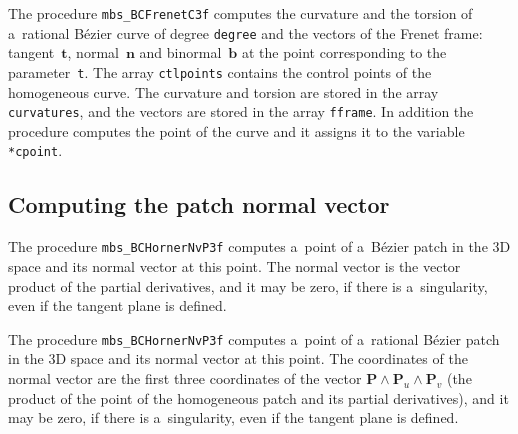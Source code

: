 \vspace{\bigskipamount}
The procedure \texttt{mbs\_BCFrenetC3f} computes the curvature and the torsion
of a~rational B\'{e}zier curve of degree \texttt{degree} and the vectors
of the Frenet frame: tangent~$\bm{t}$, normal~$\bm{n}$ and binormal~$\bm{b}$
at the point corresponding to the parameter~\texttt{t}. The array
\texttt{ctlpoints} contains the control points of the homogeneous curve.
The curvature and torsion are stored in the array \texttt{curvatures}, and
the vectors are stored in the array \texttt{fframe}. In addition the procedure
computes the point of the curve and it assigns it to the variable
\texttt{*cpoint}.


\subsection{Computing the patch normal vector}

\hspace*{\parindent}
The procedure \texttt{mbs\_BCHornerNvP3f} computes a~point of a~B\'{e}zier
patch in the $3$D space and its normal vector at this point.
The normal vector is the vector product of the partial derivatives, and it may be
zero, if there is a~singularity, even if the tangent plane is defined.

\vspace{\bigskipamount}
The procedure \texttt{mbs\_BCHornerNvP3f} computes a~point of a~rational
B\'{e}zier patch in the $3$D space and its normal vector at this point.
The coordinates of the normal vector are the first three coordinates
of the vector $\bm{P}\wedge\bm{P}_u\wedge\bm{P}_v$ (the product of the point
of the homogeneous patch and its partial derivatives), and it may be
zero, if there is a~singularity, even if the tangent plane is defined.


